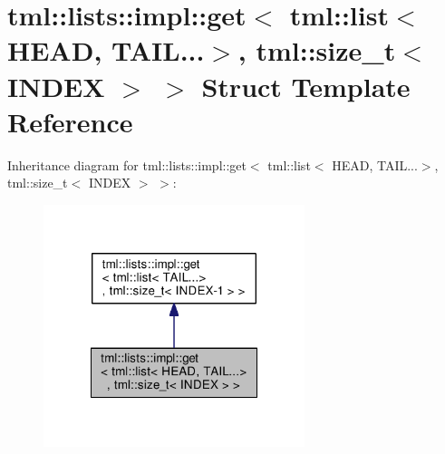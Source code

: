 \hypertarget{structtml_1_1lists_1_1impl_1_1get_3_01tml_1_1list_3_01_h_e_a_d_00_01_t_a_i_l_8_8_8_4_00_01tml_1_3ad4d0394a98a53917609e7098e78a9a}{\section{tml\+:\+:lists\+:\+:impl\+:\+:get$<$ tml\+:\+:list$<$ H\+E\+A\+D, T\+A\+I\+L...$>$, tml\+:\+:size\+\_\+t$<$ I\+N\+D\+E\+X $>$ $>$ Struct Template Reference}
\label{structtml_1_1lists_1_1impl_1_1get_3_01tml_1_1list_3_01_h_e_a_d_00_01_t_a_i_l_8_8_8_4_00_01tml_1_3ad4d0394a98a53917609e7098e78a9a}
}


Inheritance diagram for tml\+:\+:lists\+:\+:impl\+:\+:get$<$ tml\+:\+:list$<$ H\+E\+A\+D, T\+A\+I\+L...$>$, tml\+:\+:size\+\_\+t$<$ I\+N\+D\+E\+X $>$ $>$\+:
\nopagebreak
\begin{figure}[H]
\begin{center}
\leavevmode
\includegraphics[width=216pt]{structtml_1_1lists_1_1impl_1_1get_3_01tml_1_1list_3_01_h_e_a_d_00_01_t_a_i_l_8_8_8_4_00_01tml_1_ed4d07608ff8a5650c813f08df98cc85}
\end{center}
\end{figure}



